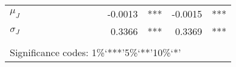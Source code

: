 \documentclass[3p]{elsarticle}
\begin{document}
\begin{table}[]
\begin{tabular}{crlrlrlrlrlrl}
\multicolumn{1}{c|}{$\mu_J$}     &                 &           &                 &           &                &            &                &            & -0.0013        & ***           & -0.0015         & ***          \\
\multicolumn{1}{c|}{$\sigma_J$}  &                 &           &                 &           &                &            &                &            & 0.3366         & ***           & 0.3369          & ***          \\
                                 &                 &           &                 &           &                &            &                &            &                &            &                 &           \\
\multicolumn{13}{l}{Significance codes: 1\%‘***’5\%‘**’10\%‘*’}                                                                                                                                                     
\end{tabular}
\end{table}
\end{document}
